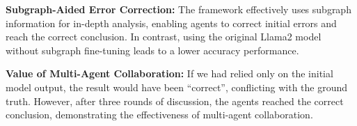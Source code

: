\noindent\textbf{Subgraph-Aided Error Correction: }
The framework effectively uses subgraph information for in-depth analysis, enabling agents to correct initial errors and reach the correct conclusion. In contrast, using the original Llama2 model without subgraph fine-tuning leads to a lower accuracy performance.

\noindent\textbf{Value of Multi-Agent Collaboration: }
If we had relied only on the initial model output, the result would have been ``correct'', conflicting with the ground truth. However, after three rounds of discussion, the agents reached the correct conclusion, demonstrating the effectiveness of multi-agent collaboration.